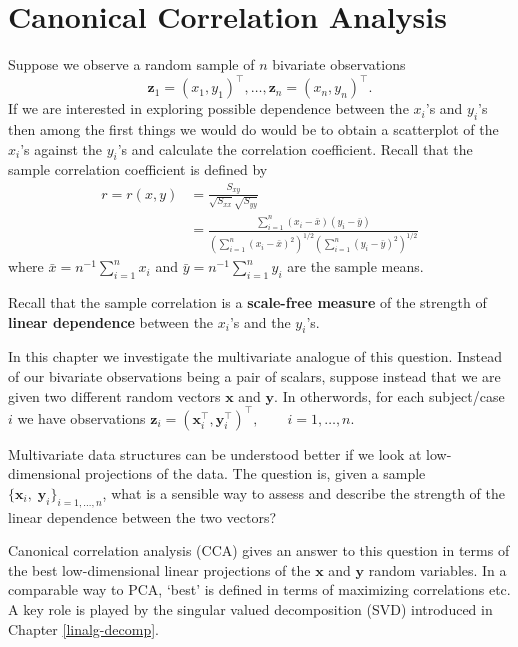 \documentclass[]{book}
\theoremstyle{definition}
\theoremstyle{definition}
\theoremstyle{definition}
\theoremstyle{remark}
\begin{document}
\hypertarget{cca}{%
\chapter{Canonical Correlation Analysis}\label{cca}}

Suppose we observe a random sample of \(n\) bivariate observations
\[
\boldsymbol z_1=(x_1,y_1)^\top , \ldots , \boldsymbol z_n=(x_n,y_n)^\top.
\]
If we are interested in exploring possible dependence between the \(x_i\)'s and \(y_i\)'s then among the first things we would do would be to obtain a scatterplot of the \(x_i\)'s against the \(y_i\)'s and calculate the correlation coefficient. Recall that the sample correlation coefficient is defined by
\begin{align}
r=r(x,y)&=\frac{S_{xy}}{\sqrt{S_{xx}}\sqrt{S_{yy}}}\\
&=\frac{\sum_{i=1}^n (x_i-\bar{x})(y_i-\bar{y})}{\left(\sum_{i=1}^n (x_i-\bar{x})^2  \right)^{1/2}  \left(\sum_{i=1}^n (y_i-\bar{y})^2 \right)^{1/2}}
\label{eq:scr}
\end{align}
where \(\bar{x}=n^{-1}\sum_{i=1}^n x_i\) and \(\bar{y}=n^{-1}\sum_{i=1}^n y_i\) are the sample means.

Recall that the sample correlation is a \textbf{scale-free measure} of the strength of \textbf{linear dependence} between the \(x_i\)'s and the \(y_i\)'s.

In this chapter we investigate the multivariate analogue of this question. Instead of our bivariate observations being a pair of scalars, suppose instead that we are given two different random vectors \(\boldsymbol x\) and \(\boldsymbol y\). In otherwords, for each subject/case \(i\) we have observations
\(\boldsymbol z_i=(\boldsymbol x_i^\top,\boldsymbol y_i^\top)^\top, \qquad i=1,\ldots, n.\)

Multivariate data structures can be understood better if we look at low-dimensional projections of the data. The question is, given a sample \(\{\boldsymbol x_i, \; \boldsymbol y_i\}_{i=1, \ldots, n}\), what is a sensible way to assess and describe the strength of the linear dependence between the two vectors?

Canonical correlation analysis (CCA) gives an answer to this question in terms of the best low-dimensional linear projections of the \(\boldsymbol x\) and \(\boldsymbol y\) random variables. In a comparable way to PCA, `best' is defined in terms of maximizing correlations etc.
A key role is played by the singular valued decomposition (SVD) introduced in Chapter \ref{linalg-decomp}.
\end{document}
